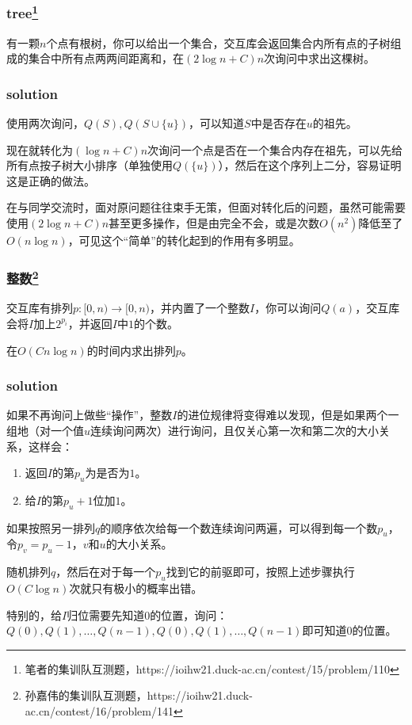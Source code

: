 \documentclass[10pt]{beamer}
\begin{document}
	\clearpage
	\begin{frame}
		\frametitle{tree\footnote[1]{笔者的集训队互测题，https://ioihw21.duck-ac.cn/contest/15/problem/110}}
	
		有一颗$n$个点有根树，你可以给出一个集合，交互库会返回集合内所有点的子树组成的集合中所有点两两间距离和，在$(2\log n+C)n$次询问中求出这棵树。

	\end{frame}
	\clearpage
	\begin{frame}
		\frametitle{solution}
	
		使用两次询问，$Q(S),Q(S\cup\{u\})$，可以知道$S$中是否存在$u$的祖先。

		现在就转化为$(\log n+C)n$次询问一个点是否在一个集合内存在祖先，可以先给所有点按子树大小排序（单独使用$Q(\{u\})$），然后在这个序列上二分，容易证明这是正确的做法。

		在与同学交流时，面对原问题往往束手无策，但面对转化后的问题，虽然可能需要使用$(2\log n+C)n$甚至更多操作，但是由完全不会，或是次数$O(n^2)$降低至了$O(n\log n)$，可见这个“简单”的转化起到的作用有多明显。
	
	\end{frame}
	\clearpage
	\begin{frame}
		\frametitle{整数\footnote[1]{孙嘉伟的集训队互测题，https://ioihw21.duck-ac.cn/contest/16/problem/141}}
	
		交互库有排列$p:[0,n)\rightarrow[0,n)$，并内置了一个整数$I$，你可以询问$Q(a)$，交互库会将$I$加上$2^{p_i}$，并返回$I$中$1$的个数。

		在$O(Cn\log n)$的时间内求出排列$p$。
	
	\end{frame}
	\clearpage
	\begin{frame}
		\frametitle{solution}
	
		如果不再询问上做些“操作”，整数$I$的进位规律将变得难以发现，但是如果两个一组地（对一个值$u$连续询问两次）进行询问，且仅关心第一次和第二次的大小关系，这样会：

		\begin{enumerate}
			\item 返回$I$的第$p_u$为是否为$1$。
			\item 给$I$的第$p_u+1$位加$1$。
		\end{enumerate}

		如果按照另一排列$q$的顺序依次给每一个数连续询问两遍，可以得到每一个数$p_u$，令$p_v=p_u-1$，$v$和$u$的大小关系。

		随机排列$q$，然后在对于每一个$p_u$找到它的前驱即可，按照上述步骤执行$O(C\log n)$次就只有极小的概率出错。

		特别的，给$I$归位需要先知道$0$的位置，询问：$Q(0),Q(1),\dots,Q(n-1),Q(0),Q(1),\dots,Q(n-1)$即可知道$0$的位置。

	\end{frame}
\end{document}
